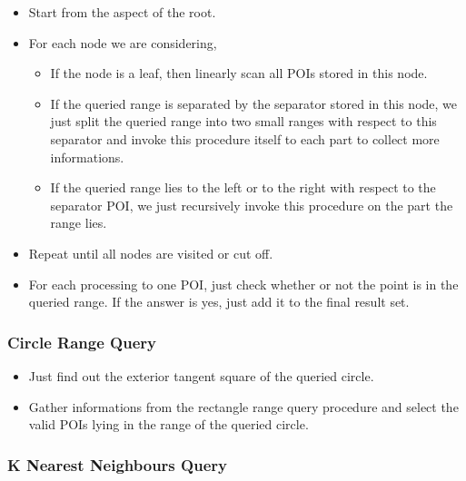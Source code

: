 \documentclass{acm_proc_article-sp}
\begin{document}
\begin{itemize}
\item Start from the aspect of the root.
\item For each node we are considering, 
\begin{itemize}
\item If the node is a leaf, then linearly scan all POIs stored in this node.
\item If the queried range is separated by the separator stored in this node, we just split the queried range into two small ranges with respect to this separator and invoke this procedure itself to each part to collect more informations.
\item If the queried range lies to the left or to the right with respect to the separator POI, we just recursively invoke this procedure on the part the range lies.
\end{itemize} 
\item Repeat until all nodes are visited or cut off.
\item For each processing to one POI, just check whether or not the point is in the queried range. If the answer is yes, just add it to the final result set.
\end{itemize}

\subsubsection{Circle Range Query}

\begin{itemize}
\item Just find out the exterior tangent square of the queried circle.
\item Gather informations from the rectangle range query procedure and select the valid POIs lying in the range of the queried circle.
\end{itemize}

\subsubsection{K Nearest Neighbours Query}
\end{document}
